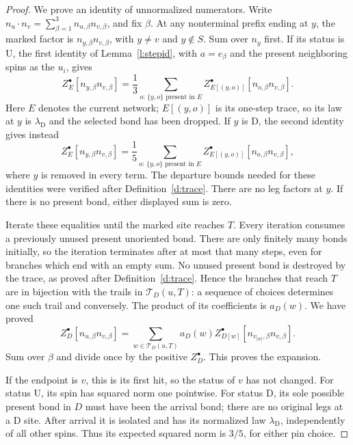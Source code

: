 \begin{proof}
We prove an identity of unnormalized numerators. Write
\(n_u\cdot n_v=\sum_{\beta=1}^3n_{u,\beta}n_{v,\beta}\), and fix
\(\beta\). At any nonterminal prefix ending at \(y\), the marked
factor is \(n_{y,\beta}n_{v,\beta}\), with \(y\ne v\) and
\(y\notin S\). Sum over \(n_y\) first.
If its status is \(\mathrm U\), the first identity of
Lemma~\ref{l:stepid}, with \(a=e_\beta\) and the present
neighboring spins as the \(u_i\), gives
\[
 Z^\bullet_E[n_{y,\beta}n_{v,\beta}]
   =\frac13\sum_{o:\,\{y,o\}\text{ present in }E}
        Z^\bullet_{E[(y,o)]}[n_{o,\beta}n_{v,\beta}].
\]
Here \(E\) denotes the current network; \(E[(y,o)]\) is its
one-step trace, so its law at \(y\) is
\(\lambda_{\mathrm D}\) and the selected bond has been dropped.
If \(y\) is \(\mathrm D\), the second identity gives instead
\[
 Z^\bullet_E[n_{y,\beta}n_{v,\beta}]
   =\frac15\sum_{o:\,\{y,o\}\text{ present in }E}
        Z^\bullet_{E[(y,o)]}[n_{o,\beta}n_{v,\beta}],
\]
where \(y\) is removed in every term.
The departure bounds needed for these identities were verified
after Definition~\ref{d:trace}. There are no leg factors at \(y\).
If there is no present bond, either displayed sum is zero.

Iterate these equalities until the marked site reaches \(T\).
Every iteration consumes a previously unused present unoriented
bond. There are only finitely many bonds initially, so the
iteration terminates after at most that many steps, even for
branches which end with an empty sum. No unused present bond is
destroyed by the trace, as proved after
Definition~\ref{d:trace}. Hence the branches that reach \(T\) are
in bijection with the trails in \(\mathcal T_D(u,T)\): a sequence
of choices determines one such trail and conversely. The product of its
coefficients is \(a_D(w)\). We have proved
\[
 Z^\bullet_D[n_{u,\beta}n_{v,\beta}]
 =\sum_{w\in\mathcal T_D(u,T)}
       a_D(w)Z^\bullet_{D[w]}
                   [n_{v_{|w|},\beta}n_{v,\beta}].
\]
Sum over \(\beta\) and divide once by the positive \(Z^\bullet_D\).
This proves the expansion.

If the endpoint is \(v\), this is its first hit, so the status of
\(v\) has not changed. For status \(\mathrm U\), its spin has
squared norm one pointwise. For status \(\mathrm D\), its sole
possible present bond in \(D\) must have been the arrival bond;
there are no original legs at a \(\mathrm D\) site. After arrival
it is isolated and has its normalized law
\(\lambda_{\mathrm D}\), independently of all other spins.
Thus its expected squared norm is \(3/5\), for either pin choice.


\end{proof}
